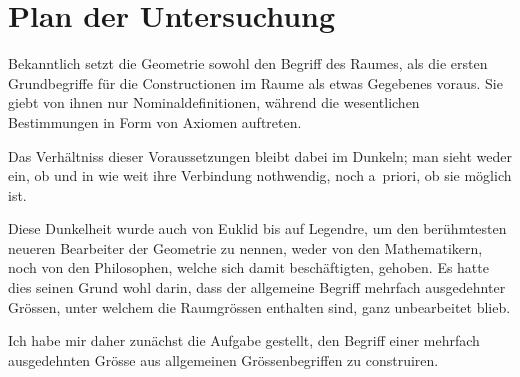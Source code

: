 \documentclass{article}
\begin{document}
\section*{Plan der Untersuchung}

Bekanntlich setzt die Geometrie sowohl den Begriff des Raumes, als die ersten
Grundbegriffe für die Constructionen im Raume als etwas Gegebenes voraus. Sie giebt
von ihnen nur Nominaldefinitionen, während die wesentlichen Bestimmungen in Form von
Axiomen auftreten.

Das Verhältniss dieser Voraussetzungen bleibt dabei im Dunkeln; man sieht weder ein,
ob und in wie weit ihre Verbindung nothwendig, noch a~priori, ob sie möglich ist.

Diese Dunkelheit wurde auch von Euklid bis auf Legendre, um den berühmtesten neueren
Bearbeiter der Geometrie zu nennen, weder von den Mathematikern, noch von den
Philosophen, welche sich damit beschäftigten, gehoben. Es hatte dies seinen Grund
wohl darin, dass der allgemeine Begriff mehrfach ausgedehnter Grössen, unter welchem
die Raumgrössen enthalten sind, ganz unbearbeitet blieb.

Ich habe mir daher zunächst die Aufgabe gestellt, den Begriff einer mehrfach
ausgedehnten Grösse aus allgemeinen Grössenbegriffen zu construiren.
\end{document}

